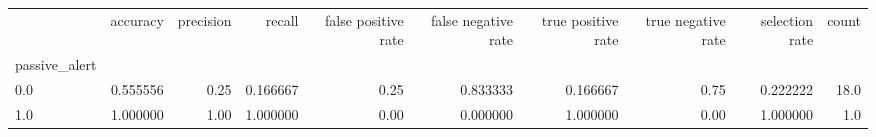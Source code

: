 \begin{tabular}{lrrrrrrrrr}
\toprule
{} &  accuracy &  precision &    recall &  false positive rate &  false negative rate &  true positive rate &  true negative rate &  selection rate &  count \\
passive\_alert &           &            &           &                      &                      &                     &                     &                 &        \\
\midrule
0.0           &  0.555556 &       0.25 &  0.166667 &                 0.25 &             0.833333 &            0.166667 &                0.75 &        0.222222 &   18.0 \\
1.0           &  1.000000 &       1.00 &  1.000000 &                 0.00 &             0.000000 &            1.000000 &                0.00 &        1.000000 &    1.0 \\
\bottomrule
\end{tabular}
